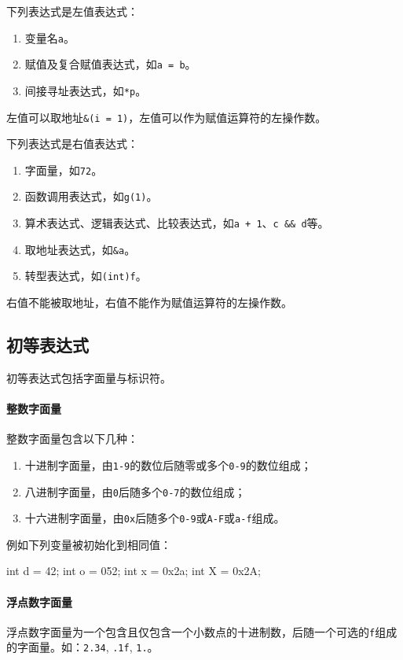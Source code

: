 \documentclass[UTF8]{ctexart}
\begin{document}
下列表达式是左值表达式：
\begin{enumerate}
	\item 变量名\verb|a|。
	\item 赋值及复合赋值表达式，如\verb|a = b|。
	\item 间接寻址表达式，如\verb|*p|。
\end{enumerate}

左值可以取地址\verb|&(i = 1)|，左值可以作为赋值运算符的左操作数。

下列表达式是右值表达式：
\begin{enumerate}
	\item 字面量，如\verb|72|。
	\item 函数调用表达式，如\verb|g(1)|。
	\item 算术表达式、逻辑表达式、比较表达式，如\verb|a + 1|、\verb|c && d|等。
	\item 取地址表达式，如\verb|&a|。
	\item 转型表达式，如\verb|(int)f|。
\end{enumerate}

右值不能被取地址，右值不能作为赋值运算符的左操作数。

\subsection{初等表达式}

初等表达式包括字面量与标识符。

\paragraph{整数字面量} 整数字面量包含以下几种：

\begin{enumerate}
	\item 十进制字面量，由\verb|1-9|的数位后随零或多个\verb|0-9|的数位组成；
	\item 八进制字面量，由\verb|0|后随多个\verb|0-7|的数位组成；
	\item 十六进制字面量，由\verb|0x|后随多个\verb|0-9|或\verb|A-F|或\verb|a-f|组成。
\end{enumerate}

例如下列变量被初始化到相同值：

\begin{MUAvbt}
int d = 42;
int o = 052;
int x = 0x2a;
int X = 0x2A;
\end{MUAvbt}

\paragraph{浮点数字面量} 浮点数字面量为一个包含且仅包含一个小数点的十进制数，后随一个可选的\verb|f|组成的字面量。如：\verb|2.34|, \verb|.1f|, \verb|1.|。
\end{document}
